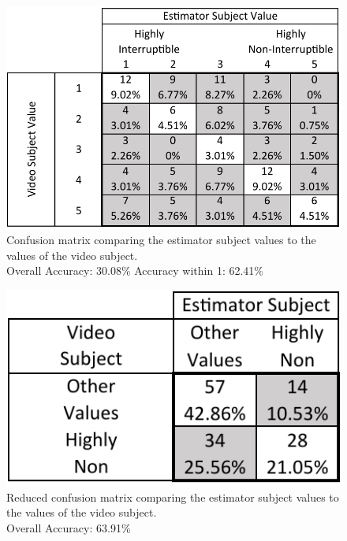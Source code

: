 \documentclass{sigchi}
\begin{document}
\begin{figure}[h]
  \centering
  \includegraphics[width=\columnwidth]{figures/VideoToEstimatorConfusionMatrix.pdf}
  \caption{Confusion matrix comparing the estimator subject values to the values of the video subject. \\Overall Accuracy: 30.08\% Accuracy within 1: 62.41\%}
  \label{fig:video_to_estimator_matrix}
\end{figure}

\begin{figure}[h]
  \centering
  \includegraphics[width=\columnwidth/2]{figures/VideoToEstimatorReducedConfusionMatrix.pdf}
  \caption{Reduced confusion matrix comparing the estimator subject values to the values of the video subject. \\Overall Accuracy: 63.91\%}
  \label{fig:reduced_video_to_estimator_matrix}
\end{figure}
\end{document}
